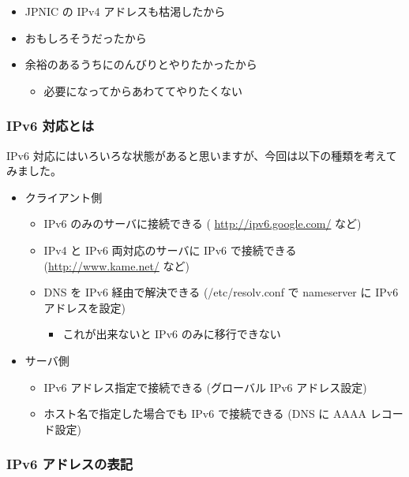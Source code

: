 \documentclass[mingoth,a4paper]{jsarticle}
\begin{document}
\begin{itemize}
\item JPNIC の IPv4 アドレスも枯渇したから
\item おもしろそうだったから
\item 余裕のあるうちにのんびりとやりたかったから

\begin{itemize}
\item 必要になってからあわててやりたくない
\end{itemize}

\end{itemize}
\subsubsection{IPv6 対応とは}

IPv6 対応にはいろいろな状態があると思いますが、今回は以下の種類を考えてみました。

\begin{itemize}
\item クライアント側

\begin{itemize}
\item IPv6 のみのサーバに接続できる ( \url{http://ipv6.google.com/} など)
\item IPv4 と IPv6 両対応のサーバに IPv6 で接続できる (\url{http://www.kame.net/} など)
\item DNS を IPv6 経由で解決できる (/etc/resolv.conf で nameserver に IPv6 アドレスを設定)

\begin{itemize}
\item これが出来ないと IPv6 のみに移行できない
\end{itemize}

\end{itemize}

\item サーバ側

\begin{itemize}
\item IPv6 アドレス指定で接続できる (グローバル IPv6 アドレス設定)
\item ホスト名で指定した場合でも IPv6 で接続できる (DNS に AAAA レコード設定)
\end{itemize}

\end{itemize}
\subsubsection{IPv6 アドレスの表記}
\end{document}
